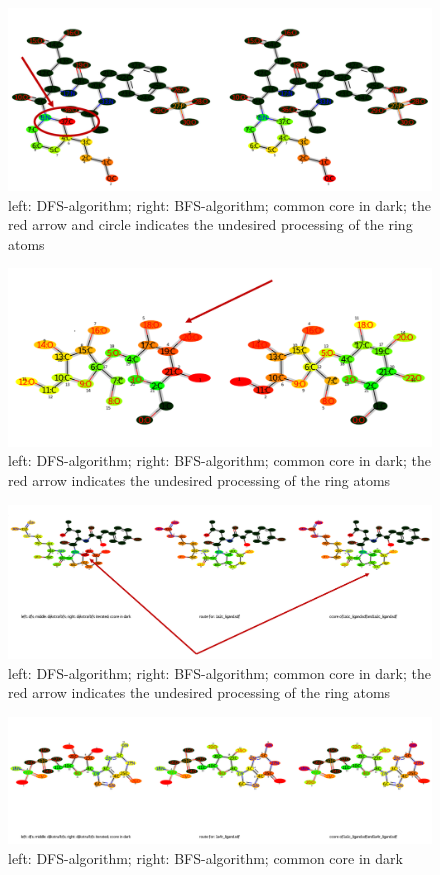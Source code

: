 \begin{figure}
\includegraphics[scale=0.4]{simple_ring_exampledfs3}\caption{left: DFS-algorithm; right: BFS-algorithm; common core in dark; the
red arrow and circle indicates the undesired processing of the ring
atoms}

\end{figure}
\begin{figure}

\includegraphics[scale=0.4]{simple_ring_exampledfs4}\caption{left: DFS-algorithm; right: BFS-algorithm; common core in dark; the
red arrow indicates the undesired processing of the ring atoms}

\end{figure}

\begin{figure}

\includegraphics[scale=0.4]{2ring_example}\caption{left: DFS-algorithm; right: BFS-algorithm; common core in dark; the
red arrow indicates the undesired processing of the ring atoms}

\end{figure}

\begin{figure}

\includegraphics[scale=0.4]{2ring_example2}\caption{left: DFS-algorithm; right: BFS-algorithm; common core in dark}

\end{figure}
